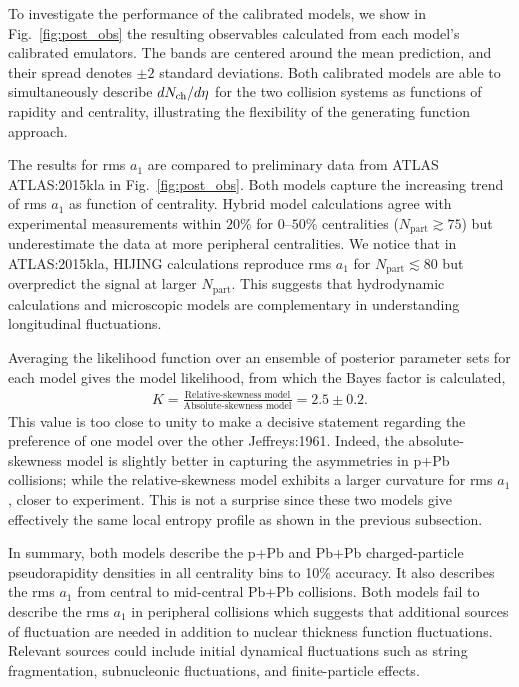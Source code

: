 To investigate the performance of the calibrated models, we show in Fig.~\ref{fig:post_obs} the resulting observables calculated from each model's calibrated emulators.
The bands are centered around the mean prediction, and their spread denotes $\pm 2$ standard deviations.
Both calibrated models are able to simultaneously describe $dN_\text{ch}/d\eta$ for the two collision systems as functions of rapidity and centrality, illustrating the flexibility of the generating function approach.

The results for rms $a_1$ are compared to preliminary data from ATLAS {ATLAS:2015kla} in Fig.~\ref{fig:post_obs}.
Both models capture the increasing trend of rms $a_1$ as function of centrality.
Hybrid model calculations agree with experimental measurements within $20\%$ for $0$--$50\%$ centralities ($N_{\textrm{part}} \gtrsim 75$) but underestimate the data at more peripheral centralities.
We notice that in {ATLAS:2015kla}, \mbox{HIJING} calculations reproduce rms $a_1$ for $N_{\textrm{part}} \lesssim 80$ but overpredict the signal at larger $N_{\textrm{part}}$.
This suggests that hydrodynamic calculations and microscopic models are complementary in understanding longitudinal fluctuations.

Averaging the likelihood function over an ensemble of posterior parameter sets for each model gives the model likelihood, from which the Bayes factor is calculated,
\begin{eqnarray}
K = \frac{\text{Relative-skewness model}}{\text{Absolute-skewness model}} = 2.5 \pm 0.2. 
\end{eqnarray}
This value is too close to unity to make a decisive statement regarding the preference of one model over the other {Jeffreys:1961}.
Indeed, the absolute-skewness model is slightly better in capturing the asymmetries in p+Pb collisions; while the relative-skewness model exhibits a larger curvature for rms $a_1$, closer to experiment.
This is not a surprise since these two models give effectively the same local entropy profile as shown in the previous subsection.

In summary, both models describe the p+Pb and Pb+Pb charged-particle pseudorapidity densities in all centrality bins to 10\% accuracy.
It also describes the rms $a_1$ from central to mid-central Pb+Pb collisions.
Both models fail to describe the rms $a_1$ in peripheral collisions which suggests that additional sources of fluctuation are needed in addition to nuclear thickness function fluctuations.
Relevant sources could include initial dynamical fluctuations such as string fragmentation, subnucleonic fluctuations, and finite-particle effects.

